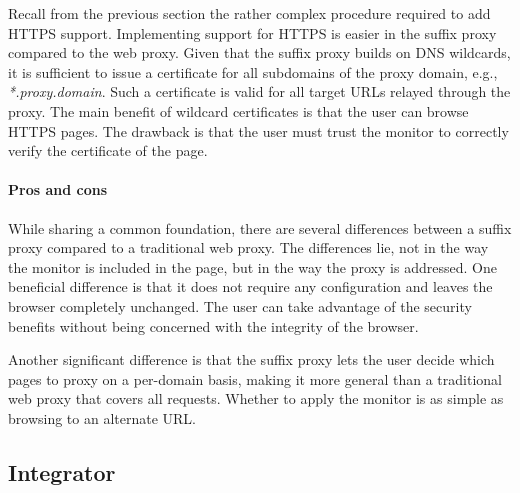 \documentclass{llncs}
\newcommand{\todo}[1]{\colorbox{red}{\textcolor{white}{\sffamily\bfseries\scriptsize TODO}} \textcolor{red}{#1} \textcolor{red}{$\blacktriangleleft$}}
\begin{document}
Recall from the previous section the rather complex procedure required to add HTTPS support.
Implementing support for HTTPS is easier in the suffix proxy compared to the web proxy. 
Given that the suffix proxy builds on DNS wildcards, it is sufficient to issue a certificate
for all subdomains of the proxy domain, e.g., \emph{*.proxy.domain}. Such a 
certificate is valid for all target URLs relayed through the proxy.
The main benefit of wildcard certificates is that the user can browse HTTPS pages. 
The drawback is that the user must trust the monitor to correctly verify the 
certificate of the page.

\paragraph{Pros and cons}

While sharing a common foundation, there are several differences between a 
suffix proxy compared to a traditional web proxy. The differences lie, not in 
the way the monitor is included in the page, but in the way the proxy is 
addressed. One beneficial difference is that it does not require any 
configuration and leaves the browser completely unchanged. The user can take
advantage of the security benefits without being concerned with the integrity 
of the browser.

Another significant difference is that the suffix proxy lets the user decide which pages to proxy on a 
per-domain basis, making it more general than a traditional web proxy that covers 
all requests. %
Whether to apply the monitor is as simple as browsing to an alternate URL.


\subsection{Integrator}

\end{document}
